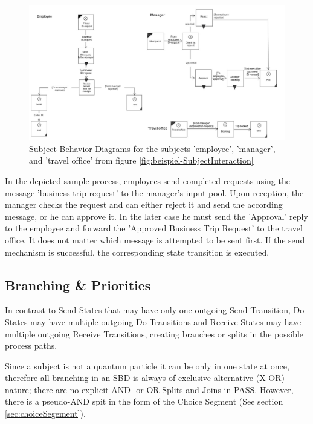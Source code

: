 \begin{landscape}
	\begin{figure}[htbp]
		\centering
		\includegraphics[width=0.9\linewidth]{Figures/Ontology/SubjectBehavior/Vollst-Beispiel}
		\caption[Subject Behavior Diagrams for the subjects 'employee', 'manager', and 'travel office' from figure \ref{fig:beispiel-SubjectInteraction}]{Subject Behavior Diagrams for the subjects 'employee', 'manager', and 'travel office' from figure \ref{fig:beispiel-SubjectInteraction}}
		\label{fig:vollst-beispiel}
	\end{figure}
\end{landscape}

In the depicted sample process, employees send completed requests using the message 'business trip request' to the manager's input pool. Upon reception, the manager checks the request and can either reject it and send the according message, or he can approve it. In the later case he must send the 'Approval' reply to the employee and forward the 'Approved Business Trip Request' to the travel office. It does not matter which message is attempted to be sent first. If the send mechanism is successful, the corresponding state transition is executed. 


\subsection{Branching \& Priorities}

In contrast to Send-States that may have only one outgoing Send Transition, Do-States may have multiple outgoing Do-Transitions and Receive States may have multiple outgoing Receive Transitions, creating branches or splits in the possible process paths. 

Since a subject is not a quantum particle it can be only in one state at once, therefore all branching in an SBD is always of exclusive alternative (X-OR) nature; there are no explicit AND- or OR-Splits and Joins in PASS.  However, there is a pseudo-AND spit in the form of the Choice Segment (See section \ref{sec:choiceSegement}).

